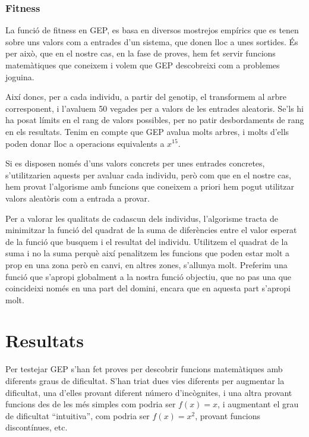 \subsubsection{Fitness} %
\label{ssub:Fitness}
La funció de fitness en GEP, es basa en diversos mostrejos empírics que es tenen
sobre uns valors com a entrades d'un sistema, que donen lloc a unes sortides.
És per això, que en el nostre cas, en la fase de proves, hem fet servir funcions
matemàtiques que coneixem i volem que GEP descobreixi com a problemes joguina.

Així doncs, per a cada individu, a partir del genotip, el transformem al arbre
corresponent, i l'avaluem 50 vegades per a valors de les entrades aleatoris.
Se'ls hi ha posat límits en el rang de valors possibles, per no patir
desbordaments de rang en els resultats.  Tenim en compte que GEP avalua molts
arbres, i molts d'ells poden donar lloc a operacions equivalents a $x^{15}$.

Si es disposen només d'uns valors concrets per unes entrades concretes,
s'utilitzarien aquests per avaluar cada individu, però com que en el nostre
cas, hem provat l'algorisme amb funcions que coneixem a priori hem pogut
utilitzar valors aleatòris com a entrada a provar.

Per a valorar les qualitats de cadascun dels individus, l'algorisme tracta de
minimitzar la funció del quadrat de la suma de diferències entre el valor
esperat de la funció que busquem i el resultat del individu.  Utilitzem el
quadrat de la suma i no la suma perquè així penalitzem les funcions que poden
estar molt a prop en una zona però en canvi, en altres zones, s'allunya molt.
Preferim una funció que s'apropi globalment a la nostra funció objectiu, que no
pas una que coincideixi només en una part del domini, encara que en aquesta part
s'apropi molt.


\section{Resultats} %
\label{sec:GResultats}

Per testejar GEP s'han fet proves per descobrir funcions matemàtiques amb
diferents graus de dificultat.  S'han triat dues vies diferents per augmentar la
dificultat, una d'elles provant diferent número d'incògnites, i una altra
provant funcions des de les més simples com podria ser $f(x)=x$, i augmentant el
grau de dificultat ``intuitiva'', com podria ser $f(x)=x^2$, provant funcions
discontínues, etc.

